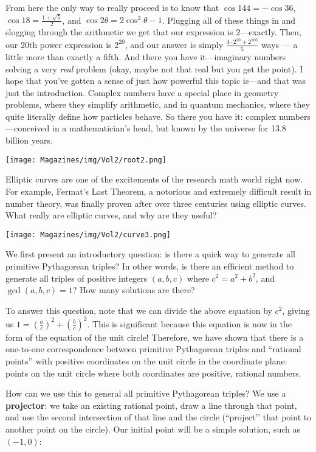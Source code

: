 \documentclass{article}
\begin{document}
\begin{multicols}{3}
From here the only way to really proceed is to know that $\cos 144=-\cos 36$, $\cos 18=\frac{1+\sqrt5}{2}$, and $\cos 2\theta=2\cos^2 \theta -1$. Plugging all of these things in and slogging through the arithmetic we get that our expression is $2$—exactly. Then, our $20$th power expression is $2^20$, and our answer is simply $\frac{4\cdot 2^{20}+2^{100}}{5}$ ways — a little more than exactly a fifth. 
And there you have it—imaginary numbers solving a very \emph{real} problem (okay, maybe not that real but you get the point). I hope that you’ve gotten a sense of just how powerful this topic is—and that was just the introduction. Complex numbers have a special place in geometry problems, where they simplify arithmetic, and in quantum mechanics, where they quite literally define how particles behave. So there you have it: complex numbers—conceived in a mathematician's head, but known by the universe for 13.8 billion years. 
\begin{center}
    \texttt{[image: Magazines/img/Vol2/root2.png]}
\end{center}
\closearticle

Elliptic curves are one of the excitements of the research math world right now. For example, Fermat’s Last Theorem, a notorious and extremely difficult result in number theory, was finally proven after over three centuries using elliptic curves. What really are elliptic curves, and why are they useful?
\begin{center}
\texttt{[image: Magazines/img/Vol2/curve3.png]}
\end{center}
We first present an introductory question: is there a quick way to generate all primitive Pythagorean triples? In other words, is there an efficient method to generate all triples of positive integers $(a, b, c)$ where $c^2=a^2+b^2$, and $\gcd(a, b, c)=1$? How many solutions are there?

To answer this question, note that we can divide the above equation by $c^2$, giving us $1=\left(\frac{a}{c}\right)^2+\left(\frac{b}{c}\right)^2$. This is significant because this equation is now in the form of the equation of the unit circle! Therefore, we have shown that there is a one-to-one correspondence between primitive Pythagorean triples and ``rational points’’ with positive coordinates on the unit circle in the coordinate plane: points on the unit circle where both coordinates are positive, rational numbers.


How can we use this to general all primitive Pythagorean triples? We use a \textbf{projector}: we take an existing rational point, draw a line through that point, and use the second intersection of that line and the circle (``project’’ that point to another point on the circle). Our initial point will be a simple solution, such as $(-1, 0)$:


\end{multicols}
\end{document}
